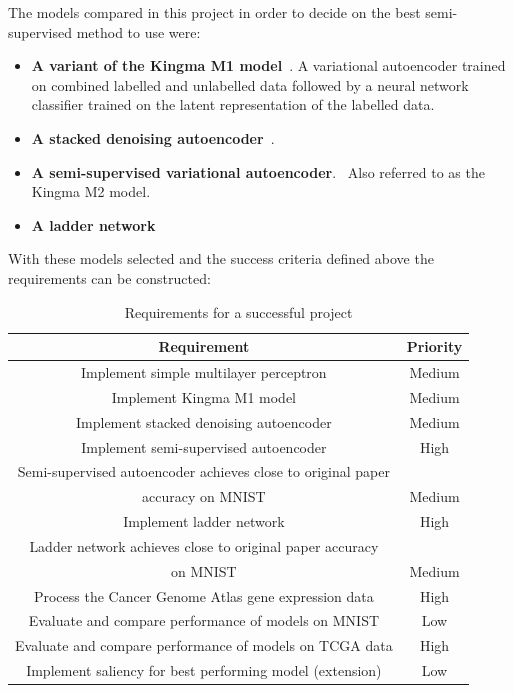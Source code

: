 \documentclass[12pt,a4paper,twoside,openright]{report}
\begin{document}
The models compared in this project in order to decide on the best semi-supervised method to use were:

\begin{itemize}
  \item \textbf{A variant of the Kingma M1 model}~\cite{DBLP:journals/corr/KingmaRMW14}. A variational autoencoder trained on combined 
        labelled and unlabelled data followed by a neural network classifier trained on the latent representation of the labelled data.
  \item \textbf{A stacked denoising autoencoder}~\cite{Vincent:2010:SDA:1756006.1953039}.
  \item \textbf{A semi-supervised variational autoencoder}.~\cite{DBLP:journals/corr/KingmaRMW14} Also referred to as the Kingma M2 model.
  \item \textbf{A ladder network}~\cite{DBLP:journals/corr/RasmusVHBR15}
\end{itemize}

With these models selected and the success criteria defined above the requirements can be constructed:

\begin{table}[H]
  \label{tab:requirements}
  \small %
  \centering %
  \begin{tabular}{cc} %
  \toprule[\heavyrulewidth]\toprule[\heavyrulewidth]
  \textbf{Requirement} & \textbf{Priority} \\ 
  \midrule
  Implement simple multilayer perceptron & Medium \\
  Implement Kingma M1 model & Medium \\
  Implement stacked denoising autoencoder & Medium \\
  Implement semi-supervised autoencoder & High \\
  Semi-supervised autoencoder achieves close to original paper \\ accuracy on MNIST & Medium \\
  Implement ladder network & High \\
  Ladder network achieves close to original paper accuracy \\ on MNIST & Medium \\
  Process the Cancer Genome Atlas gene expression data & High \\
  Evaluate and compare performance of models on MNIST & Low \\
  Evaluate and compare performance of models on TCGA data & High \\
  Implement saliency for best performing model (extension) & Low \\
  \bottomrule[\heavyrulewidth] 
  \end{tabular}
  \caption{Requirements for a successful project} 
\end{table}
\end{document}
